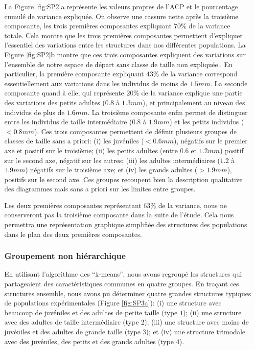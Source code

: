 La Figure \ref{fig:SP2}a représente les valeurs propres de l'ACP et le
pourcentage cumulé de variance expliquée. On observe une cassure nette après la
troisième composante, les trois premières composantes expliquant $70\%$ de la
variance totale. Cela montre que les trois premières composantes permettent
d'expliquer l'essentiel des variations entre les structures dans nos différentes
populations. La Figure \ref{fig:SP2}b montre que ces trois composantes
expliquent des variations sur l'ensemble de notre espace de départ sans classe
de taille non expliquée..
En particulier, la première composante expliquant $43\%$ de la variance
correspond essentiellement aux variations dans les individus de moins de
$1.5mm$. La seconde composante quand à elle, qui représente $20\%$ de la
variance explique une partie des variations des petits adultes ($0.8$ à
$1.3mm$), et principalement au niveau des individus de plus de $1.6mm$. La troisième
composante enfin permet de distinguer entre les individus de taille
intermédiaire ($0.8$ à $1.9mm$) et les petits individus ($<0.8mm$). Ces trois
composantes permettent de définir plusieurs groupes de classes de taille sans a
priori: (i) les juvéniles ($<0.6mm$), négatifs sur le premier axe et positif sur
le troisième; (ii) les petits adultes (entre $0.6$ et $1.2mm$) positif sur le
second axe, négatif sur les autres; (iii) les adultes intermédiaires ($1.2$ à
$1.9mm$) négatifs sur le troisième axe; et (iv) les grands adultes ($>1.9mm$),
positifs sur le second axe. Ces groupes recoupent bien la description
qualitative des diagrammes mais sans a priori sur les limites entre groupes.

Les deux premières composantes représentant $63\%$ de la variance, nous ne
conserveront pas la troisième composante dans la suite de l'étude. Cela nous
permettra une représentation graphique simplifiée des structures des populations
dans le plan des deux premières composantes. 

\subsubsection{Groupement non hiérarchique}

En utilisant l'algorithme des ``k-means'', nous avons regroupé les structures
qui partageaient des caractéristiques communes en quatre groupes. En traçant ces
structures ensemble, nous avons pu déterminer quatre grandes structures typiques
de populations expérimentales (Figure \ref{fig:SP3a}): (i) une
structure avec beaucoup de juvéniles et des adultes de petite taille (type $1$);
(ii) une structure avec des adultes de taille intermédiaire (type $2$); (iii)
une structure avec moins de juvéniles et des adultes de grande taille (type
$3$); et (iv) une structure trimodale avec des juvéniles, des petits et des
grands adultes (type $4$).


